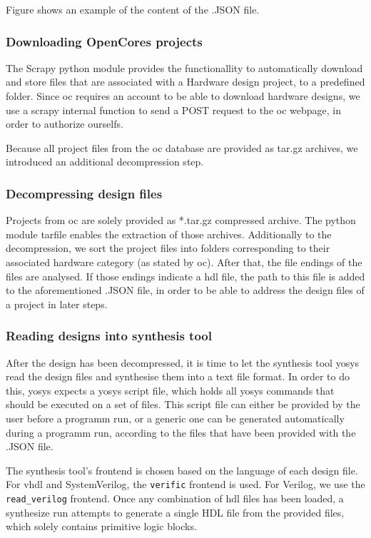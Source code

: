 Figure  shows an example of the content of the .JSON file. 

\subsubsection{Downloading OpenCores projects}
The Scrapy python module provides the functionallity to automatically download and
store files that are associated with a Hardware design project, to a predefined
folder. Since \gls{oc} requires an account to be able to download hardware designs, 
we use a scrapy internal function to send a POST request to the \gls{oc} webpage,
in order to authorize ourselfs. 

Because all project files from the \gls{oc} database are provided as tar.gz archives,
we introduced an additional decompression step.  

\subsubsection{Decompressing design files} 
Projects from \gls{oc} are solely provided as *.tar.gz compressed archive. The \gls{python}
module tarfile enables the extraction of those archives. Additionally 
to the decompression, we sort the project files into folders corresponding to 
their associated hardware category (as stated by \gls{oc}). After that, the file 
endings of the files are analysed. If those endings indicate a \gls{hdl} file, the path 
to this file is added to the aforementioned .JSON file, in order to be able to
address the design files of a project in later steps.

\subsubsection{Reading designs into synthesis tool} 
After the design has been decompressed, it is time to let the synthesis tool 
yosys read the design files and synthesise them into a text file format. In 
order to do this, yosys expects a yosys script file, which holds all yosys commands 
that should be executed on a set of files. This script file can either be provided
by the user before a programm run, or a generic one can be generated automatically 
during a programm run, according to the files that have been provided with the 
.JSON file. 

The synthesis tool's frontend is chosen based on the language of each design file.
For \gls{vhdl} and SystemVerilog, the \lstinline{verific} frontend is used. For Verilog,
we use the \lstinline{read_verilog} frontend. Once any combination of \gls{hdl} files
has been loaded, a synthesize run attempts to generate a single HDL file from the provided
files, which solely contains primitive logic blocks. 

